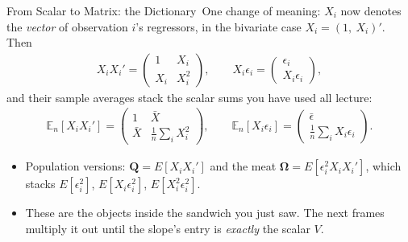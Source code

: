 \documentclass[aspectratio=169,11pt,xcolor=dvipsnames]{beamer}
\newcommand{\E}{E}
\newcommand{\En}{\mathbb{E}_n}
\newcommand{\Om}{\bm{\Omega}}
\newcommand{\adv}{\,\raisebox{0.6pt}{\textcolor{accent}{$\bigstar$}}}
\begin{document}
\begin{frame}{From Scalar to Matrix: the Dictionary\adv}
One change of meaning: $X_i$ now denotes the \emph{vector} of observation
$i$'s regressors, in the bivariate case $X_i = (1,\ X_i)'$. Then
\begin{align*}
  X_iX_i' = \begin{pmatrix} 1 & X_i \\ X_i & X_i^2 \end{pmatrix},
  \qquad
  X_i\epsilon_i = \begin{pmatrix} \epsilon_i \\ X_i\epsilon_i \end{pmatrix},
\end{align*}
and their sample averages stack the scalar sums you have used all lecture:
\begin{align*}
  \En[X_iX_i'] =
  \begin{pmatrix} 1 & \bar X \\ \bar X & \tfrac1n\sum_i X_i^2 \end{pmatrix},
  \qquad
  \En[X_i\epsilon_i] =
  \begin{pmatrix} \bar\epsilon \\ \tfrac1n\sum_i X_i\epsilon_i \end{pmatrix}.
\end{align*}
\begin{itemize}\itemsep2pt
  \item Population versions: $\bm Q = \E[X_iX_i']$ and the meat
        $\Om = \E[\epsilon_i^2X_iX_i']$, which stacks
        $\E[\epsilon_i^2]$, $\E[X_i\epsilon_i^2]$, $\E[X_i^2\epsilon_i^2]$.
  \item These are the objects inside the sandwich you just saw. The next
        frames multiply it out until the slope's entry is \emph{exactly} the
        scalar $V$.
\end{itemize}
\end{frame}
\end{document}
